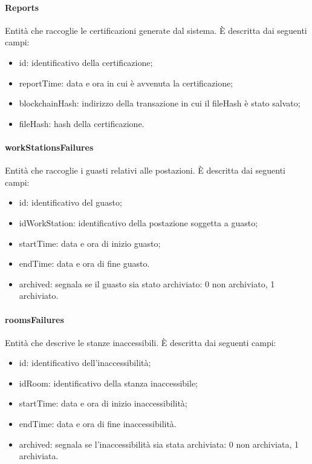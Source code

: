 \paragraph{Reports}
Entità che raccoglie le certificazioni generate dal sistema. È descritta dai seguenti campi:
\begin{itemize}
	\item id: identificativo della certificazione;
	\item reportTime: data e ora in cui è avvenuta la certificazione;
	\item blockchainHash: indirizzo della transazione in cui il fileHash è stato salvato;
	\item fileHash: hash della certificazione.
\end{itemize}

\paragraph{workStationsFailures}
Entità che raccoglie i guasti relativi alle postazioni. È descritta dai seguenti campi:
\begin{itemize}
	\item id: identificativo del guasto;
	\item idWorkStation: identificativo della postazione soggetta a guasto;
	\item startTime: data e ora di inizio guasto;
	\item endTime: data e ora di fine guasto.
	\item archived: segnala se il guasto sia stato archiviato: 0 non archiviato, 1 archiviato.
\end{itemize}

\paragraph{roomsFailures}
Entità che descrive le stanze inaccessibili. È descritta dai seguenti campi:
\begin{itemize}
	\item id: identificativo dell'inaccessibilità;
	\item idRoom: identificativo della stanza inaccessibile;
	\item startTime: data e ora di inizio inaccessibilità;
	\item endTime: data e ora di fine inaccessibilità.
	\item archived: segnala se l'inaccessibilità sia stata archiviata: 0 non archiviata, 1 archiviata.
\end{itemize}

